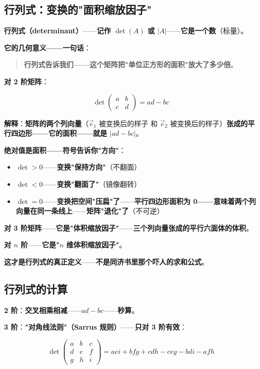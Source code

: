 \subsection{行列式：变换的"面积缩放因子"}

\textbf{行列式（determinant）}——\textbf{记作 $\det(A)$ 或 $|A|$}——\textbf{它是一个数}（标量）。

\textbf{它的几何意义——一句话}：

\begin{quote}
\textbf{行列式告诉我们——这个矩阵把"单位正方形的面积"放大了多少倍}。
\end{quote}

\textbf{对 2 阶矩阵}：

\[
\det\begin{pmatrix} a & b \\ c & d \end{pmatrix} = ad - bc
\]

\textbf{解释}：\textbf{矩阵的两个列向量}（$\vec{e}_1$ 被变换后的样子 和 $\vec{e}_2$ 被变换后的样子）\textbf{张成的平行四边形——它的面积——就是 $|ad - bc|$}。

\textbf{绝对值是面积——符号告诉你"方向"}：

\begin{itemize}
\item \textbf{$\det > 0$}——\textbf{变换"保持方向"}（不翻面）
\item \textbf{$\det < 0$}——\textbf{变换"翻面了"}（镜像翻转）
\item \textbf{$\det = 0$}——\textbf{变换把空间"压扁"了}——\textbf{平行四边形面积为 0——意味着两个列向量在同一条线上}——\textbf{矩阵"退化"了}（不可逆）
\end{itemize}

\textbf{对 3 阶矩阵}——\textbf{它是"体积缩放因子"}——\textbf{三个列向量张成的平行六面体的体积}。

\textbf{对 $n$ 阶}——\textbf{它是"$n$ 维体积缩放因子"}。

\textbf{这才是行列式的真正定义}——\textbf{不是同济书里那个吓人的求和公式}。

\subsection{行列式的计算}

\textbf{2 阶}：\textbf{交叉相乘相减}——\textbf{$ad - bc$}——\textbf{秒算}。

\textbf{3 阶}：\textbf{"对角线法则"（Sarrus 规则）}——\textbf{只对 3 阶有效}：

\[
\det\begin{pmatrix} a & b & c \\ d & e & f \\ g & h & i \end{pmatrix}
= aei + bfg + cdh - ceg - bdi - afh
\]

